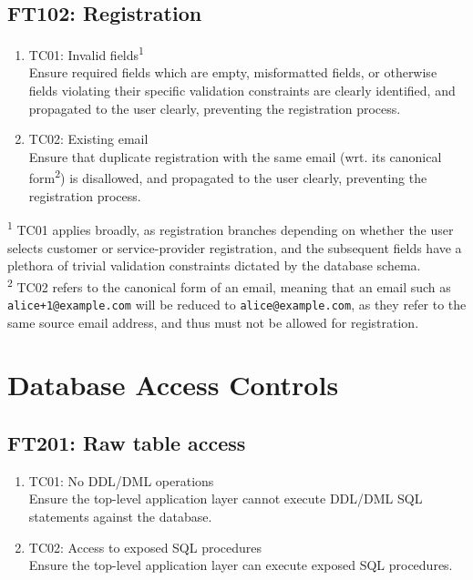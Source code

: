 \documentclass[journal]{IEEEtran}
\begin{document}
	\subsection{\textsc{FT102:} Registration}
	\begin{enumerate}
		\item \textsc{TC01:} Invalid fields\textsuperscript{1} \label{tc01}\\
		Ensure required fields which are empty, misformatted fields, or otherwise fields violating their specific validation constraints are clearly identified, and propagated to the user clearly, preventing the registration process.
		
		\item \textsc{TC02:} Existing email \label{tc02}\\
		Ensure that duplicate registration with the same email (wrt. its canonical form\textsuperscript{2}) is disallowed, and propagated to the user clearly, preventing the registration process.
	\end{enumerate}
	
	\vspace{1em}
	
	\noindent\textsuperscript{1} \textsc{TC01} applies broadly, as registration branches depending on whether the user selects customer or service-provider registration, and the subsequent fields have a plethora of trivial validation constraints dictated by the database schema.\\
	\textsuperscript{2} \textsc{TC02} refers to the canonical form of an email, meaning that an email such as \texttt{alice+1@example.com} will be reduced to \texttt{alice@example.com}, as they refer to the same source email address, and thus must not be allowed for registration.
	
	\section{Database Access Controls}
	\subsection{\textsc{FT201:} Raw table access}
	\begin{enumerate}
		\item \textsc{TC01:} No DDL/DML operations\\
		Ensure the top-level application layer cannot execute DDL/DML SQL statements against the database.
		\item \textsc{TC02:} Access to exposed SQL procedures\\
		Ensure the top-level application layer can execute exposed SQL procedures.
	\end{enumerate}
\end{document}
